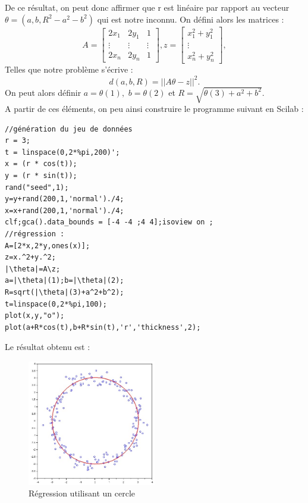          De ce résultat, on peut donc affirmer que r est linéaire par rapport au vecteur $\theta=(a,b,R^2-a^2-b^2)$ qui est notre inconnu.
         On défini alors les matrices : 
         $$
         A=\begin{bmatrix}
             2x_1&2y_1&1\\
             \vdots&\vdots&\vdots\\
             2x_n&2y_n&1
         \end{bmatrix},
         z= \begin{bmatrix}
             x_1^2+y_1^2\\
             \vdots\\
             x_n^2+y_n^2
         \end{bmatrix},
         $$
         Telles que notre problème s'écrive :
         $$d(a,b,R)=||A\theta-z||^2.$$
         On peut alors définir $a=\theta(1),$ $ b=\theta(2) $ et $ R=\sqrt{\theta(3)+a^2+b^2}$. \\A partir de ces éléments, on peu ainsi construire le programme suivant en Scilab  :
         \begin{center}
          \begin{verbatim}
//génération du jeu de données
r = 3;
t = linspace(0,2*%pi,200)';
x = (r * cos(t));
y = (r * sin(t));
rand("seed",1);
y=y+rand(200,1,'normal')./4;
x=x+rand(200,1,'normal')./4;
clf;gca().data_bounds = [-4 -4 ;4 4];isoview on ;
//régression :
A=[2*x,2*y,ones(x)];
z=x.^2+y.^2;
|\theta|=A\z;
a=|\theta|(1);b=|\theta|(2);
R=sqrt(|\theta|(3)+a^2+b^2);
t=linspace(0,2*%pi,100);
plot(x,y,"o");
plot(a+R*cos(t),b+R*sin(t),'r','thickness',2);
          \end{verbatim}
                \label{lst:code_9}
         \end{center}
         \newpage
        Le résultat obtenu est : 
        \begin{figure}[h]
              \centering
              \captionsetup{font=small}
                \includegraphics[width=0.5\textwidth]{images/cercle.jpg}
              \caption{Régression utilisant un cercle}
              \label{fig:reg6}
            \end{figure}
